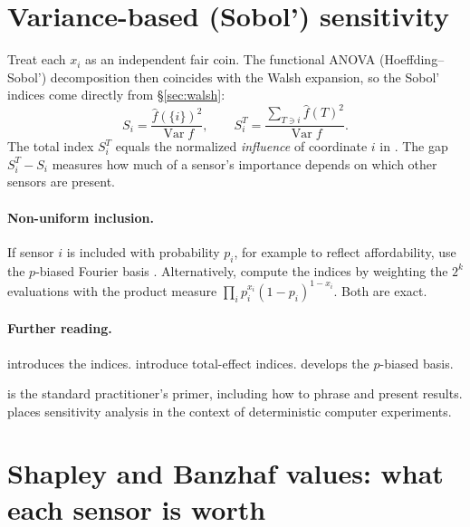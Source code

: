 \documentclass[11pt]{article}
\newcommand{\Var}{\operatorname{Var}}
\newcommand{\fh}{\widehat{f}}
\begin{document}
\section{Variance-based (Sobol') sensitivity}\label{sec:sobol}

Treat each $x_i$ as an independent fair coin.
The functional ANOVA (Hoeffding--Sobol') decomposition then coincides with the Walsh expansion, so the Sobol' indices come directly from \S\ref{sec:walsh}:
\begin{equation}
  S_i=\frac{\fh(\{i\})^2}{\Var f},\qquad
  S_i^{T}=\frac{\sum_{T\ni i}\fh(T)^2}{\Var f}.
\end{equation}
The total index $S_i^T$ equals the normalized \emph{influence} of coordinate $i$ in \textcite[\S2.2]{ODonnell2014}.
The gap $S_i^T-S_i$ measures how much of a sensor's importance depends on which other sensors are present.

\paragraph{Non-uniform inclusion.}
If sensor $i$ is included with probability $p_i$, for example to reflect affordability, use the $p$-biased Fourier basis \parencite[Ch.~8]{ODonnell2014}.
Alternatively, compute the indices by weighting the $2^k$ evaluations with the product measure $\prod_i p_i^{x_i}(1-p_i)^{1-x_i}$.
Both are exact.

\paragraph{Further reading.}
\begin{reading}
  \item[Mathematics.] \textcite{Sobol1993} introduces the indices.
        \textcite{HommaSaltelli1996} introduce total-effect indices.
        \textcite[Ch.~8]{ODonnell2014} develops the $p$-biased basis.
  \item[Applying it.] \textcite{Saltelli2008} is the standard practitioner's primer, including how to phrase and present results.
        \textcite{Santner2018} places sensitivity analysis in the context of deterministic computer experiments.
\end{reading}

\section{Shapley and Banzhaf values: what each sensor is worth}\label{sec:shapley}
\end{document}
